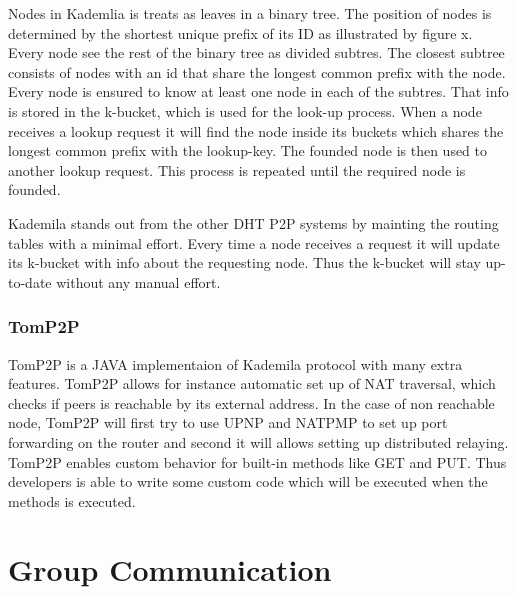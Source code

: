 Nodes in Kademlia is treats as leaves in a binary tree. The position of nodes is determined by the shortest unique prefix of its ID as illustrated by figure x. Every node see the rest of the binary tree as divided subtres. The closest subtree consists of nodes with an id that share the longest common prefix with the node. Every node is ensured to know at least one node in each of the subtres. That info is stored in the k-bucket, which is used for the look-up process. When a node receives a lookup request it will find the node inside its buckets which shares the longest common prefix with the lookup-key. The founded node is then used to another lookup request. This process is repeated until the required node is founded.

Kademila stands out from the other DHT P2P systems by mainting the routing tables with a minimal effort. Every time a node receives a request it will update its k-bucket with info about the requesting node. Thus the k-bucket will stay up-to-date without any manual effort.



\subsubsection{TomP2P}
TomP2P is a JAVA implementaion of Kademila protocol with many extra features. TomP2P allows for instance automatic set up of NAT traversal, which checks if peers is reachable by its external address. In the case of non reachable node, TomP2P will first try to use UPNP and NATPMP to set up port forwarding on the router and second it will allows setting up distributed relaying. TomP2P enables custom behavior for built-in methods like GET and PUT. Thus developers is able to write some custom code which will be executed when the methods is executed.



\section{Group Communication}
